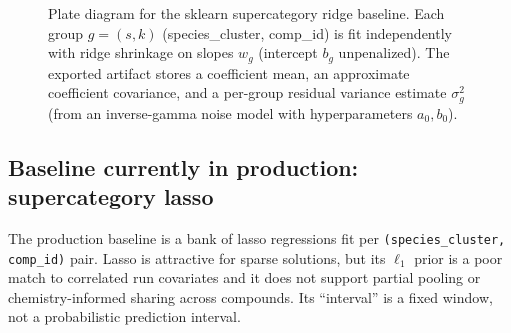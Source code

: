 \documentclass[11pt]{article}
\begin{document}
\begin{figure}[H]
\centering
\small
{}
\caption{Plate diagram for the sklearn supercategory ridge baseline. Each group $g=(s,k)$ (species\_cluster, comp\_id) is fit independently with ridge shrinkage on slopes $w_g$ (intercept $b_g$ unpenalized). The exported artifact stores a coefficient mean, an approximate coefficient covariance, and a per-group residual variance estimate $\sigma_g^2$ (from an inverse-gamma noise model with hyperparameters $a_0,b_0$).}
\label{fig:rt_sklearn_ridge_plate}
\end{figure}

\subsection{Baseline currently in production: supercategory lasso}

The production baseline is a bank of lasso regressions fit per \texttt{(species\_cluster, comp\_id)} pair. Lasso is
attractive for sparse solutions, but its $\ell_1$ prior is a poor match to correlated run covariates and it does not
support partial pooling or chemistry-informed sharing across compounds. Its ``interval'' is a fixed window, not a
probabilistic prediction interval.
\end{document}
